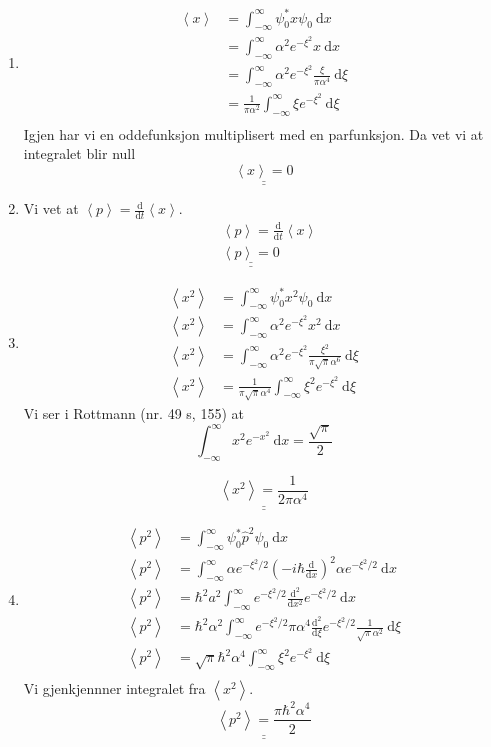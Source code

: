 \documentclass{article}
\begin{document}
\begin{enumerate}[\bf I]
\item 
\begin{align*}
\left<x\right> &= ∫_{-∞}^{∞} ψ_0^{*}xψ_0 \ \mathrm{d}x 
\\
    &= ∫_{-∞}^{∞} α^2e^{-ξ^2}x \ \mathrm{d}x
\\ 
    &= ∫_{-∞}^{∞} α^2e^{-ξ^2} \frac{ξ}{πα^4} \ \mathrm{d}ξ
\\
    &= \frac{1}{πα^2}∫_{-∞}^{∞} ξ e^{-ξ^2} \ \mathrm{d}ξ
\\
\end{align*}
Igjen har vi en oddefunksjon multiplisert med en parfunksjon. Da vet vi at integralet blir null
\[
\underline{\underline{\left<x\right> =  0}}
\]
\item 
Vi vet at $\left<p\right> = \frac{\mathrm{d}}{\mathrm{d}t}\left<x\right>$.
\begin{align*}
&\left<p\right> = \frac{\mathrm{d}}{\mathrm{d}t}\left<x\right> 
\\
&\underline{\underline{\left<p\right> = 0}}
\end{align*} 

\item
\begin{align*}
\left<x^2\right> &= ∫_{-∞}^{∞} ψ_0^{*}x^2ψ_0 \ \mathrm{d}x 
\\
\left<x^2\right> &= ∫_{-∞}^{∞} α^2e^{-ξ^2}x^2 \ \mathrm{d}x 
\\
\left<x^2\right> &= ∫_{-∞}^{∞} α^2e^{-ξ^2} \frac{ξ^2}{π\sqrt{π}α^6} \ \mathrm{d}ξ 
\\ 
\left<x^2\right> &= \frac{1}{π\sqrt{π}α^4}∫_{-∞}^{∞} ξ^2 e^{-ξ^2} \ \mathrm{d}ξ
\end{align*}
Vi ser i Rottmann (nr. 49 s, 155) at
\[
∫_{-∞}^{∞} x^2 e^{-x^2} \ \mathrm{d}x = \frac{\sqrt{π}}{2}
\]

\[
\underline{\underline{\left<x^2\right> = \frac{1}{2πα^4}}}
\] 
\item 
\begin{align*}
\left<p^2\right> &= ∫_{-∞}^{∞} ψ_0^{*}\hat{p}^2 ψ_0 \ \mathrm{d}x 
\\ 
\left<p^2\right> &=  ∫_{-∞}^{∞} αe^{-ξ^2 /2} \left(-iℏ \frac{\mathrm{d}}{\mathrm{d}x}\right)^2 αe^{-ξ^2 / 2} \ \mathrm{d}x
\\
\left<p^2\right> &= ℏ^2a^2 ∫_{-∞}^{∞} e^{-ξ^2 / 2} \frac{\mathrm{d}^2}{\mathrm{d}x^2}e^{-ξ^2 / 2} \ \mathrm{d}x
\\
\left<p^2\right> &= ℏ^2α^2 ∫_{-∞}^{∞} e^{-ξ^2 / 2} πα^{4} \frac{\mathrm{d}^2}{\mathrm{d}ξ}e^{-ξ^2 / 2} \frac{1}{\sqrt{π}α^2} \ \mathrm{d}ξ
\\ 
\left<p^2\right> &= \sqrt{π}ℏ^2α^4 ∫_{-∞}^{∞} ξ^2 e^{-ξ^2} \ \mathrm{d}ξ\\
\end{align*}
Vi gjenkjennner integralet fra $\left<x^2\right>$. 
\[
\underline{\underline{\left<p^2\right> = \frac{πℏ^2α^{4}}{2}}}
\]
\end{enumerate}
\end{document}
